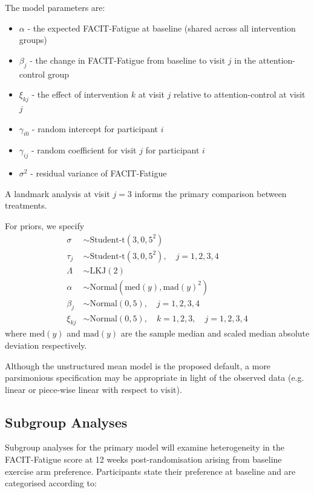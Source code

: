 \documentclass[11pt,parskip=half-]{scrartcl}
\providecommand{\tightlist}{%
  \setlength{\itemsep}{0pt}\setlength{\parskip}{0pt}}
\begin{document}
The model parameters are:

\begin{itemize}
  \tightlist
  \item $\alpha$ - the expected FACIT-Fatigue at baseline (shared across all intervention groups)
  \item $\beta_j$ - the change in FACIT-Fatigue from baseline to visit $j$ in the attention-control group
  \item $\xi_{kj}$ - the effect of intervention $k$ at visit $j$ relative to attention-control at visit $j$
  \item $\gamma_{i0}$ - random intercept for participant $i$
  \item $\gamma_{ij}$ - random coefficient for visit $j$ for participant $i$
  \item $\sigma^2$ - residual variance of FACIT-Fatigue
\end{itemize}
A landmark analysis at visit $j=3$ informs the primary comparison between treatments.

For priors, we specify
$$
  \begin{aligned}
    \sigma   & \sim \text{Student-t}(3, 0, 5^2)                              \\
    \tau_j   & \sim \text{Student-t}(3, 0, 5^2),\quad j=1,2,3,4              \\
    \Lambda  & \sim \text{LKJ}(2)                                            \\
    \alpha   & \sim \text{Normal}\left(\text{med}(y), \text{mad}(y)^2\right) \\
    \beta_j  & \sim \text{Normal}\left(0, 5\right),\quad j=1,2,3,4           \\
    \xi_{kj} & \sim \text{Normal}(0, 5),\quad k=1,2,3,\quad j=1,2,3,4
  \end{aligned}
$$
where $\text{med}(y)$ and $\text{mad}(y)$ are the sample median and scaled median absolute deviation respectively.

Although the unstructured mean model is the proposed default, a more parsimonious specification may be appropriate in light of the observed data (e.g. linear or piece-wise linear with respect to visit).

\subsection{Subgroup Analyses}\label{subgroup-analyses}

Subgroup analyses for the primary model will examine heterogeneity in the FACIT-Fatigue score at 12 weeks post-randomisation arising from baseline exercise arm preference. Participants state their preference at baseline and are categorised according to:
\end{document}
